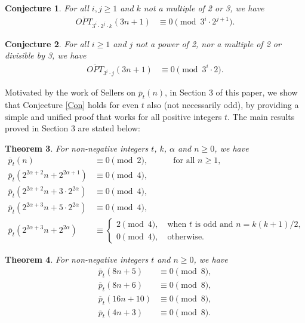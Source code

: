\documentclass[12pt,reqno,a4paper]{amsart}
\newtheorem{theorem}{Theorem}[section]
\newtheorem{conjecture}[theorem]{Conjecture}
\numberwithin{equation}{section}
\begin{document}
\begin{conjecture}\label{Con5}
    For all $i,j\geq 1$ and $k$ not a multiple of 2 or 3, we have
    \begin{align}
 \label{H3}   \overline{OPT}_{3^i\cdot 2^j\cdot k}(3n+1)& \equiv 0 \pmod{3^{i}\cdot 2^{j+1}}.
    \end{align}
\end{conjecture}
\begin{conjecture}\label{Con6}
    For all $i\geq 1$ and $j$ not a power of 2,  nor a multiple of 2 or divisible by 3, we have
    \begin{align}
 \label{H4}   \overline{OPT}_{3^i\cdot j}(3n+1)& \equiv 0 \pmod{3^{i}\cdot 2}.
    \end{align}
\end{conjecture}

Motivated by the work of Sellers \cite{sellers2024elementary} on $\overline{p}_{t}(n)$, in Section 3 of this paper, we show that Conjecture \ref{Con} holds for even $t$ also (not necessarily odd), by providing a simple and unified proof that works for all positive integers $t$. The main results proved in Section 3 are stated below:
\begin{theorem}\label{T1}
For non-negative integers $t$, $k$, $\alpha$ and $n\geq 0$, we have
    \begin{align}
      \label{C1}  \overline{p}_{t}(n)& \equiv 0 \pmod{2},\qquad \quad \text{for all $n\geq 1$,}\\
       \label{C2}  \overline{p}_{t}\left(2^{2\alpha+2}n+2^{2\alpha+1}\right)& \equiv 0 \pmod{4},\\
       \label{C3}  \overline{p}_{t}\left(2^{2\alpha+2}n+3\cdot2^{2\alpha}\right)& \equiv 0 \pmod{4},\\
\label{C10}  \overline{p}_{t}\left(2^{2\alpha+3}n+5\cdot2^{2\alpha}\right)& \equiv 0 \pmod{4},\\
\label{11}\overline{p}_{t}(2^{2\alpha+3}n+2^{2\alpha})&\equiv \begin{cases}
       2 \pmod{4},\quad \text{when $t$ is odd and $n=k(k+1)/2$,}\\
         0\pmod{4},\quad \text{otherwise.}
   \end{cases}
   \end{align}
   \end{theorem}
\begin{theorem}\label{T2}
For non-negative integers $t$ and $n\geq 0$, we have
\begin{align}
\label{C5} \overline{p}_{t}(8n+5)& \equiv 0 \pmod{8},\\
 \label{C12} \overline{p}_{t}(8n+6)& \equiv 0 \pmod{8},\\
\label{C13} \overline{p}_{t}(16n+10)& \equiv 0 \pmod{8},\\
 \label{C4} \overline{p}_{t}(4n+3)& \equiv 0 \pmod{8}.
 \end{align}
 \end{theorem}
\end{document}
